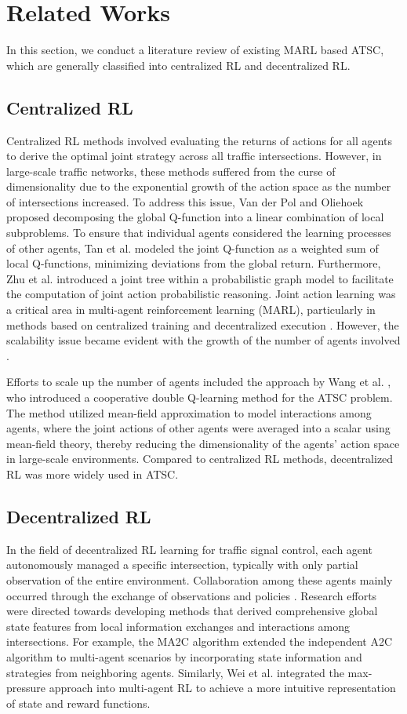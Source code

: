 \section{Related Works}
\label{S2}
In this section, we conduct a literature review of existing MARL based ATSC, which are generally classified into centralized RL and decentralized RL.
\subsection{Centralized RL}
Centralized RL methods involved evaluating the returns of actions for all agents to derive the optimal joint strategy across all traffic intersections. However, in large-scale traffic networks, these methods suffered from the curse of dimensionality due to the exponential growth of the action space as the number of intersections increased. To address this issue, Van der Pol and Oliehoek \cite{22} proposed decomposing the global Q-function into a linear combination of local subproblems. To ensure that individual agents considered the learning processes of other agents, Tan et al. \cite{23} modeled the joint Q-function as a weighted sum of local Q-functions, minimizing deviations from the global return. Furthermore, Zhu et al. \cite{24} introduced a joint tree within a probabilistic graph model to facilitate the computation of joint action probabilistic reasoning. Joint action learning was a critical area in multi-agent reinforcement learning (MARL), particularly in methods based on centralized training and decentralized execution \cite{25}\cite{26}. However, the scalability issue became evident with the growth of the number of agents involved \cite{new7}.

Efforts to scale up the number of agents included the approach by Wang et al. \cite{27}, who introduced a cooperative double Q-learning method for the ATSC problem. The method utilized mean-field approximation \cite{28} to model interactions among agents, where the joint actions of other agents were averaged into a scalar using mean-field theory, thereby reducing the dimensionality of the agents' action space in large-scale environments. Compared to centralized RL methods, decentralized RL was more widely used in ATSC.

\subsection{Decentralized RL}
In the field of decentralized RL learning for traffic signal control, each agent autonomously managed a specific intersection, typically with only partial observation of the entire environment. Collaboration among these agents mainly occurred through the exchange of observations and policies \cite{29}. Research efforts were directed towards developing methods that derived comprehensive global state features from local information exchanges and interactions among intersections. For example, the MA2C algorithm \cite{30} extended the independent A2C algorithm to multi-agent scenarios by incorporating state information and strategies from neighboring agents. Similarly, Wei et al. \cite{31} integrated the max-pressure approach \cite{32} into multi-agent RL to achieve a more intuitive representation of state and reward functions.

